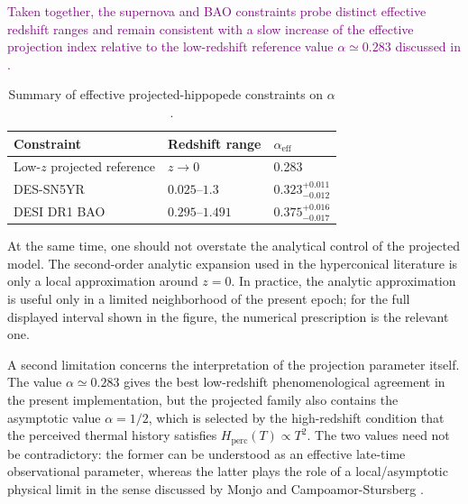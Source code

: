 \documentclass[11pt]{article}
\newcommand{\purple}[1]{\textcolor{purple}{#1}}
\begin{document}
\purple{Taken together, the supernova and BAO constraints probe distinct effective redshift ranges and remain consistent with a slow increase of the effective projection index relative to the low-redshift reference value $\alpha\simeq0.283$ discussed in \cite{monjo2018projected}.}

\begin{table}[h]
\centering
\color{purple}
\small
\caption{Summary of effective projected-hippopede constraints on $\alpha$.}
\label{tab:alpha_summary}
\begin{tabular}{lll}
\hline
Constraint & Redshift range & $\alpha_{\mathrm{eff}}$ \\
\hline
Low-$z$ projected reference \cite{monjo2018projected} & $z \rightarrow 0$ & 0.283 \\
DES-SN5YR \cite{abbott2024dark} & $0.025$--$1.3$ & $0.323_{-0.012}^{+0.011}$ \\
DESI DR1 BAO \cite{adame2025desi} & $0.295$--$1.491$ & $0.375_{-0.017}^{+0.016}$ \\
\hline
\end{tabular}
\end{table}






At the same time, one should not overstate the analytical control of the projected model. The second-order analytic expansion used in the hyperconical literature is only a local approximation around $z=0$. In practice, the analytic approximation is useful only in a limited neighborhood of the present epoch; for the full displayed interval shown in the figure, the numerical prescription is the relevant one.

A second limitation concerns the interpretation of the projection parameter itself. The value $\alpha\simeq0.283$ gives the best low-redshift phenomenological agreement in the present implementation, but the projected family also contains the asymptotic value $\alpha=1/2$, which is selected by the high-redshift condition that the perceived thermal history satisfies $H_{\mathrm{perc}}(T)\propto T^2$. The two values need not be contradictory: the former can be understood as an effective late-time observational parameter, whereas the latter plays the role of a local/asymptotic physical limit in the sense discussed by Monjo and Campoamor-Stursberg \cite{monjo2020lagrangian, monjo2023hubble}.
\end{document}
